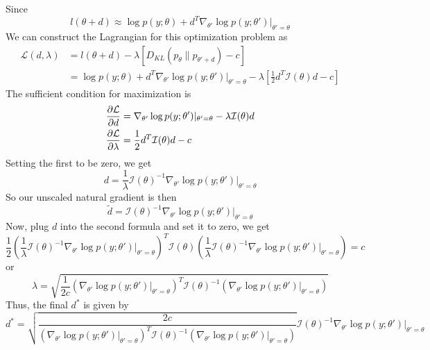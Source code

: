 \begin{answer}
    Since
$$
l(\theta+ d) \approx \log p(y;\theta) + d^T\nabla_{\theta'}\log p(y;\theta')|_{\theta' =\theta}
$$
We can construct the Lagrangian for this optimization problem as
$$
\begin{aligned}
\mathcal L(d, \lambda) &= l(\theta+d)  - \lambda[D_{KL}(p_{\theta}\|p_{\theta' + d}) - c]\\
&= \log p(y;\theta) + d^T\nabla_{\theta'}\log p(y;\theta')|_{\theta' = \theta} - \lambda[\frac{1}{2}d^T\mathcal I(\theta)d - c]
\end{aligned}
$$
The sufficient condition for maximization is
$$
\begin{aligned}
\frac{\partial \cal L}{\partial d} &=  \nabla_{\theta'}\log p(y;\theta')|_{\theta' = \theta} - \lambda \mathcal I(\theta)d\\
\frac{\partial \cal L}{\partial \lambda} &= \frac{1}{2}d^T\mathcal I(\theta) d - c
\end{aligned}
$$
Setting the first to be zero, we get
$$
d = \frac{1}{\lambda}\mathcal I(\theta)^{-1}\nabla_{\theta'}\log p(y;\theta')|_{\theta' = \theta}
$$
So our unscaled natural gradient is then
$$
\tilde d = \mathcal I(\theta)^{-1} \nabla_{\theta'}\log p(y;\theta')|_{\theta'  = \theta}
$$
Now, plug $d$ into the second formula and set it to zero, we get
$$
\frac{1}{2}(\frac{1}{\lambda}\mathcal I(\theta)^{-1}\nabla_{\theta'}\log p(y;\theta')|_{\theta' = \theta})^T\mathcal I(\theta) (\frac{1}{\lambda}\mathcal I(\theta)^{-1}\nabla_{\theta'}\log p(y;\theta')|_{\theta' = \theta}) = c
$$
or
$$
\lambda = \sqrt{\frac{1}{2c}(\nabla_{\theta'}\log p(y;\theta')|_{\theta' = \theta})^T\mathcal I(\theta)^{-1} (\nabla_{\theta'}\log p(y;\theta')|_{\theta' = \theta})}
$$
Thus, the final $d^*$ is given by
$$
d^{*} =\sqrt{\frac{2c}{(\nabla_{\theta'}\log p(y;\theta')|_{\theta' = \theta})^T\mathcal I(\theta)^{-1} (\nabla_{\theta'}\log p(y;\theta')|_{\theta' = \theta})}}\mathcal I(\theta)^{-1}\nabla_{\theta'}\log p(y;\theta')|_{\theta' = \theta}
$$


 \end{answer}
